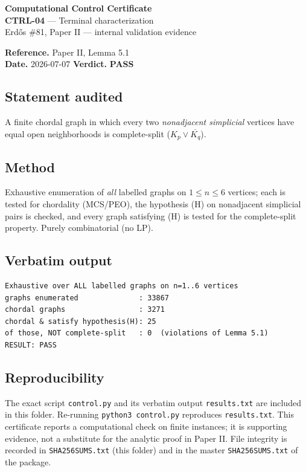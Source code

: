 \documentclass[11pt]{article}
\begin{document}
\begin{center}{\Large\textbf{Computational Control Certificate}}\\[2pt]
{\large \textbf{CTRL-04} --- Terminal characterization}\\[2pt]
Erd\H{o}s \#81, Paper II --- internal validation evidence\\
\end{center}
\vspace{0.3em}
\noindent\textbf{Reference.} Paper II, Lemma 5.1\\
\textbf{Date.} 2026-07-07 \qquad \textbf{Verdict.} \textcolor{pass}{\textbf{PASS}}

\subsection*{Statement audited}
A finite chordal graph in which every two \emph{nonadjacent simplicial} vertices have equal open neighborhoods is complete-split ($K_p\vee\overline{K_q}$).

\subsection*{Method}
Exhaustive enumeration of \emph{all} labelled graphs on $1\le n\le 6$ vertices; each is tested for chordality (MCS/PEO), the hypothesis (H) on nonadjacent simplicial pairs is checked, and every graph satisfying (H) is tested for the complete-split property. Purely combinatorial (no LP).

\subsection*{Verbatim output}
\begin{Verbatim}[fontsize=\small,frame=single]
Exhaustive over ALL labelled graphs on n=1..6 vertices
graphs enumerated              : 33867
chordal graphs                 : 3271
chordal & satisfy hypothesis(H): 25
of those, NOT complete-split   : 0  (violations of Lemma 5.1)
RESULT: PASS

\end{Verbatim}

\subsection*{Reproducibility}
The exact script \texttt{control.py} and its verbatim output \texttt{results.txt} are included in this
folder. Re-running \texttt{python3 control.py} reproduces \texttt{results.txt}. This certificate reports a
computational check on finite instances; it is supporting evidence, not a substitute for the analytic
proof in Paper II. File integrity is recorded in \texttt{SHA256SUMS.txt} (this folder) and in the master
\texttt{SHA256SUMS.txt} of the package.
\end{document}
